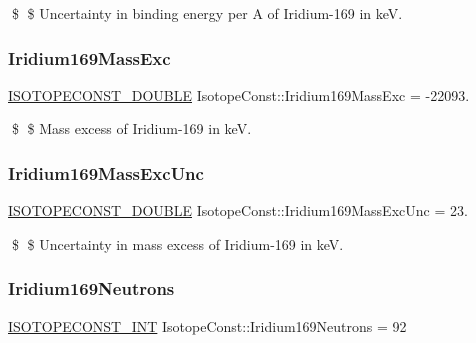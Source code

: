 \$ \$ Uncertainty in binding energy per A of Iridium-\/169 in keV. \mbox{\label{group___isotope_const-_iridium-_ir169_ga2578eefb4a033ea592287f074b14b1f1}} 
\subsubsection{\texorpdfstring{Iridium169\+Mass\+Exc}{Iridium169MassExc}}
{\footnotesize\ttfamily \mbox{\hyperlink{group___isotope_const-_macros_ga8f45a7272ce02c0b4c65c44636ed719a}{I\+S\+O\+T\+O\+P\+E\+C\+O\+N\+S\+T\+\_\+\+D\+O\+U\+B\+LE}} Isotope\+Const\+::\+Iridium169\+Mass\+Exc = -\/22093.}

\$ \$ Mass excess of Iridium-\/169 in keV. \mbox{\label{group___isotope_const-_iridium-_ir169_ga0c22270d2798ea48db15851a233bc262}} 
\subsubsection{\texorpdfstring{Iridium169\+Mass\+Exc\+Unc}{Iridium169MassExcUnc}}
{\footnotesize\ttfamily \mbox{\hyperlink{group___isotope_const-_macros_ga8f45a7272ce02c0b4c65c44636ed719a}{I\+S\+O\+T\+O\+P\+E\+C\+O\+N\+S\+T\+\_\+\+D\+O\+U\+B\+LE}} Isotope\+Const\+::\+Iridium169\+Mass\+Exc\+Unc = 23.}

\$ \$ Uncertainty in mass excess of Iridium-\/169 in keV. \mbox{\label{group___isotope_const-_iridium-_ir169_gaa83da7e50babdedf4d6fa28b8032120a}} 
\subsubsection{\texorpdfstring{Iridium169\+Neutrons}{Iridium169Neutrons}}
{\footnotesize\ttfamily \mbox{\hyperlink{group___isotope_const-_macros_ga5f18360b3e99483a35c32d789e62621c}{I\+S\+O\+T\+O\+P\+E\+C\+O\+N\+S\+T\+\_\+\+I\+NT}} Isotope\+Const\+::\+Iridium169\+Neutrons = 92}


